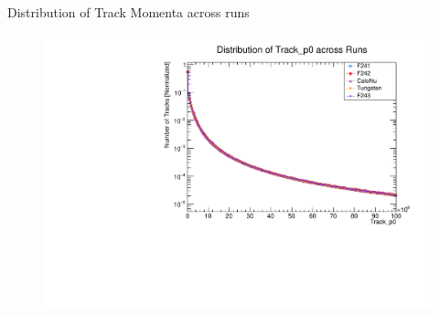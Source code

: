 \begin{frame}{Distribution of Track Momenta across runs}
	\begin{figure}
		\includegraphics[width=\linewidth]{./RunwisePlots/Track_p0_runwise.pdf}
	\end{figure}
\end{frame}


